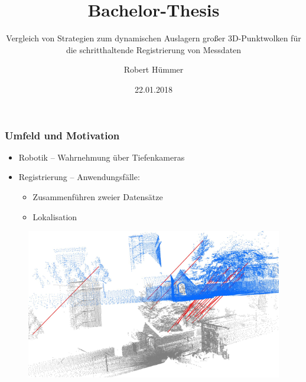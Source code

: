 \documentclass[presentation]{beamer}
\title[Bachelor-Thesis]{Bachelor-Thesis} %
\subtitle{Vergleich von Strategien zum dynamischen Auslagern großer 3D-Punktwolken für die schritthaltende Registrierung von Messdaten}
\author{Robert Hümmer} %
\institute[Fakultät für Informatik] %
{
	University of Applied Science Rosenheim \\
	\medskip
	\textit{\_\_\_\_\_\_@\_\_\_\_\_.com} %
}
\date{22.01.2018} %
\begin{document}

\maketitle %

\begin{frame}
\frametitle{Umfeld und Motivation}
%
	\begin{itemize}
		\item Robotik -- Wahrnehmung über Tiefenkameras %
		\item Registrierung -- Anwendungsfälle: 
		\begin{itemize}
			\item Zusammenführen zweier Datensätze %
			\item Lokalisation %
		\end{itemize}
	\end{itemize}
	\begin{figure} 
		\centering
		\begin{minipage}{.5\textwidth}
			\centering
			\includegraphics[width=0.90\linewidth]{figures/introduction/registration_outdoor.png}

\end{minipage}
\end{figure}
\end{frame}
\end{document}
